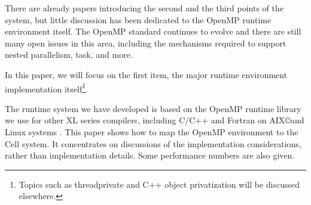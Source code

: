 
There are already papers introducing the second and the third points\cite{Br07}
of the system, but little discussion has been dedicated to the OpenMP runtime
environment itself. The OpenMP standard continues to evolve and there
are still many open issues in this area, including the mechanisms required to
support nested parallelism, task, and more.

In this paper, we will focus on the first item, the major runtime environment
implementation itself\footnote{Topics such as threadprivate and C++ object
privatization will be discussed elsewhere.}.

The runtime system we have developed is based on the OpenMP
runtime library we use for other XL series compilers, including C/C++
and Fortran on AIX\copyright and Linux systems \cite{Zha04}. This paper
shows how to map the OpenMP environment to the Cell system. It
concentrates on discussions of the implementation considerations,
rather than implementation details. Some performance numbers are also
given.

